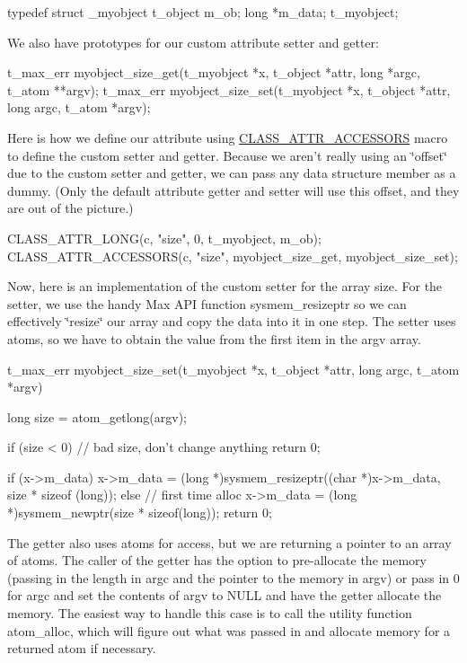 \begin{DoxyCode}
    typedef struct _myobject {
        t_object m_ob;
        long *m_data;
    } t_myobject;
\end{DoxyCode}


We also have prototypes for our custom attribute setter and getter:


\begin{DoxyCode}
    t_max_err myobject_size_get(t_myobject *x, t_object *attr, long *argc, 
      t_atom **argv);
    t_max_err myobject_size_set(t_myobject *x, t_object *attr, long argc, t_atom 
      *argv);
\end{DoxyCode}


Here is how we define our attribute using \hyperlink{group__attr_ga51b1e8466f45d86683437a77be600fb8}{CLASS\_\-ATTR\_\-ACCESSORS} macro to define the custom setter and getter. Because we aren't really using an \char`\"{}offset\char`\"{} due to the custom setter and getter, we can pass any data structure member as a dummy. (Only the default attribute getter and setter will use this offset, and they are out of the picture.)


\begin{DoxyCode}
    CLASS_ATTR_LONG(c, "size", 0, t_myobject, m_ob);
    CLASS_ATTR_ACCESSORS(c, "size", myobject_size_get, myobject_size_set);
\end{DoxyCode}


Now, here is an implementation of the custom setter for the array size. For the setter, we use the handy Max API function sysmem\_\-resizeptr so we can effectively \char`\"{}resize\char`\"{} our array and copy the data into it in one step. The setter uses atoms, so we have to obtain the value from the first item in the argv array.


\begin{DoxyCode}
    t_max_err myobject_size_set(t_myobject *x, t_object *attr, long argc, t_atom 
      *argv)
    {
        long size = atom_getlong(argv);
 
        if (size < 0)       // bad size, don't change anything
            return 0;
 
        if (x->m_data)
            x->m_data = (long *)sysmem_resizeptr((char *)x->m_data, size * sizeof
      (long));
        else    // first time alloc
            x->m_data = (long *)sysmem_newptr(size * sizeof(long));
        return 0;
    }
\end{DoxyCode}


The getter also uses atoms for access, but we are returning a pointer to an array of atoms. The caller of the getter has the option to pre-\/allocate the memory (passing in the length in argc and the pointer to the memory in argv) or pass in 0 for argc and set the contents of argv to NULL and have the getter allocate the memory. The easiest way to handle this case is to call the utility function atom\_\-alloc, which will figure out what was passed in and allocate memory for a returned atom if necessary.


